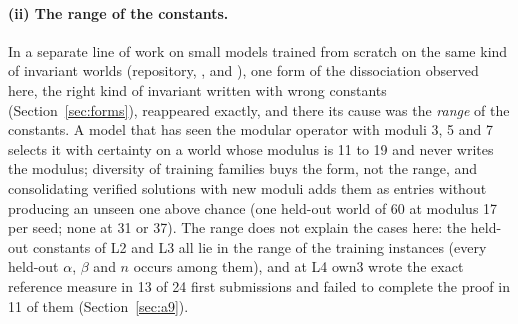 \documentclass[11pt]{article}
\begin{document}
\paragraph{(ii) The range of the constants.} In a separate line of work on
small models trained from scratch on the same kind of invariant worlds
(repository, ,
 and
), one form of the
dissociation observed here, the right kind of invariant written with wrong
constants (Section~\ref{sec:forms}), reappeared exactly, and there its
cause was the \emph{range} of the constants. A model that has seen the
modular operator with moduli 3, 5 and 7 selects it with certainty on a
world whose modulus is 11 to 19 and never writes the modulus; diversity of
training families buys the form, not the range, and consolidating
verified solutions with new moduli adds them as entries without producing
an unseen one above chance (one held-out world of 60 at modulus 17 per
seed; none at 31 or 37). The range does not explain the cases here: the
held-out constants of L2 and L3 all lie in the range of the training
instances (every held-out $\alpha$, $\beta$ and $n$ occurs among them),
and at L4 own3 wrote the exact reference measure in 13 of 24 first
submissions and failed to complete the proof in 11 of them
(Section~\ref{sec:a9}).
\end{document}
